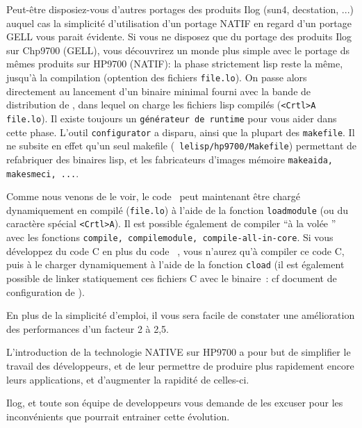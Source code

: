 Peut-\^{e}tre disposiez-vous d'autres portages des produits Ilog (sun4,
decstation, ...) auquel cas la simplicit\'{e} d'utilisation d'un portage
NATIF en regard d'un portage GELL vous parait \'{e}vidente. 
Si vous ne disposez que du portage des produits Ilog sur Chp9700
(GELL), vous 
d\'{e}couvrirez un monde plus simple avec le portage ds m\^{e}mes produits
sur HP9700 (NATIF): la phase strictement lisp reste la m\^{e}me, jusqu'\`{a}
la compilation (optention des fichiers {\tt file.lo}). On passe alors
directement au lancement d'un binaire minimal fourni avec la bande de
distribution de \LeLisp , dans lequel on charge les fichiers lisp compil\'{e}s
({\tt <Crtl>A file.lo}). Il existe toujours un {\tt g\'{e}n\'{e}rateur de runtime}
pour vous aider dans cette phase.
L'outil {\tt configurator} a disparu, ainsi que la plupart des
{\tt makefile}. Il ne subsite en effet qu'un seul makefile ({\tt
lelisp/hp9700/Makefile}) permettant de refabriquer des binaires lisp,
et les fabricateurs d'images m\'{e}moire {\tt makeaida, makesmeci, ...}.
\par
Comme nous venons de le voir, le code \LeLisp\ peut maintenant \^{e}tre
charg\'{e} dynamiquement en compil\'{e} ({\tt file.lo}) \`{a} l'aide de la
fonction {\tt loadmodule} (ou du caract\`{e}re sp\'{e}cial {\tt <Crtl>A}). Il est
possible \'{e}galement de compiler ``\`{a} 
la vol\'{e}e {''} avec les fonctions {\tt compile, compilemodule,
compile-all-in-core}. Si vous d\'{e}veloppez du code C en plus du code
\LeLisp\ , vous n'aurez qu'\`{a} compiler ce code C, puis \`{a} le charger
dynamiquement \`{a} l'aide de la fonction {\tt cload} (il est \'{e}galement
possible de linker statiquement ces fichiers C avec le binaire
\LeLisp\,: cf document de configuration de \LeLisp ).
\par
En plus de la simplicit\'{e} d'emploi, il vous sera facile de constater
une am\'{e}lioration des performances d'un facteur 2 \`{a} 2,5.

L'introduction de la technologie NATIVE sur HP9700 a pour but de
simplifier le travail des d\'{e}veloppeurs, et de leur permettre de
produire plus rapidement encore leurs applications, et d'augmenter la
rapidit\'{e} de celles-ci.
\par
Ilog, et toute son \'{e}quipe de developpeurs vous demande
de les excuser pour les inconv\'{e}nients que pourrait entrainer cette
\'{e}volution.

\tableofcontents






